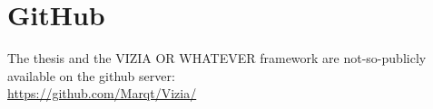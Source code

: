 
\chapter{GitHub}
The thesis and the VIZIA OR WHATEVER framework are not-so-publicly available on the github server: \\
\url{https://github.com/Marqt/Vizia/} 
